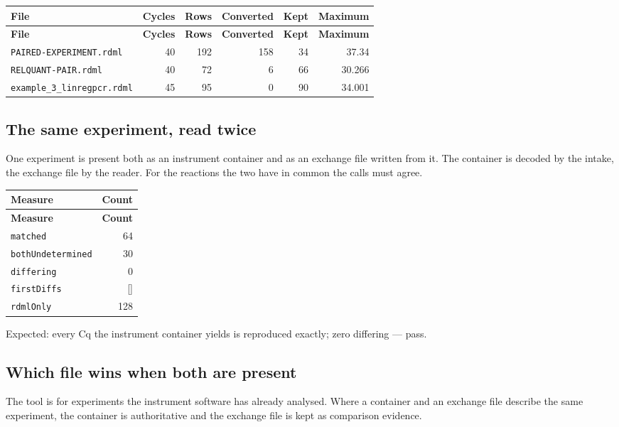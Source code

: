 {\small
\begin{xltabular}{\linewidth}{|X|r|r|r|r|r|}
\toprule \textbf{File} & \textbf{Cycles} & \textbf{Rows} & \textbf{Converted} & \textbf{Kept} & \textbf{Maximum} \\\midrule\endfirsthead
\toprule \textbf{File} & \textbf{Cycles} & \textbf{Rows} & \textbf{Converted} & \textbf{Kept} & \textbf{Maximum} \\\midrule\endhead
\texttt{PAIRED-EXPERIMENT.rdml} & 40 & 192 & 158 & 34 & 37.34 \\
\texttt{RELQUANT-PAIR.rdml} & 40 & 72 & 6 & 66 & 30.266 \\
\texttt{example\_3\_linregpcr.rdml} & 45 & 95 & 0 & 90 & 34.001 \\
\bottomrule
\end{xltabular}}


\subsection*{The same experiment, read twice}
One experiment is present both as an instrument container and as an exchange file
written from it. The container is decoded by the intake, the exchange file by the
reader. For the reactions the two have in common the calls must agree.

{\small
\begin{xltabular}{\linewidth}{|X|r|}
\toprule \textbf{Measure} & \textbf{Count} \\\midrule\endfirsthead
\toprule \textbf{Measure} & \textbf{Count} \\\midrule\endhead
\texttt{matched} & 64 \\
\texttt{bothUndetermined} & 30 \\
\texttt{differing} & 0 \\
\texttt{firstDiffs} & [] \\
\texttt{rdmlOnly} & 128 \\
\bottomrule
\end{xltabular}}

\par Expected: every Cq the instrument container yields is reproduced exactly; zero differing --- pass.


\subsection*{Which file wins when both are present}
The tool is for experiments the instrument software has already analysed. Where a
container and an exchange file describe the same experiment, the container is
authoritative and the exchange file is kept as comparison evidence.

